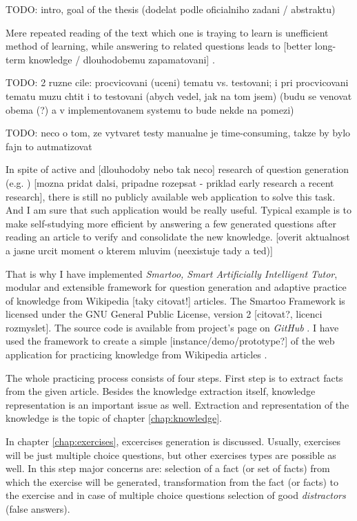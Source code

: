 \documentclass[a4paper, 12pt, twoside]{fithesis2}		%
\renewcommand{\_}{\leavevmode \kern0.0em\vbox{\hrule width0.4em}}
\newcounter{choice}
\begin{document}
TODO: intro, goal of the thesis (dodelat podle oficialniho zadani / abstraktu)

Mere repeated reading of the text which one is traying to learn is unefficient method of learning, while answering to related questions leads to [better long-term knowledge / dlouhodobemu zapamatovani] \parencite{edu-improve}.

TODO: 2 ruzne cile: procvicovani (uceni) tematu vs. testovani; i pri procvicovani tematu muzu chtit i to testovani (abych vedel, jak na tom jsem) (budu se venovat obema (?) a v implementovanem systemu to bude nekde na pomezi)

TODO: neco o tom, ze vytvaret testy manualne je time-consuming, takze by bylo fajn to autmatizovat

In spite of active and [dlouhodoby nebo tak neco] research of question generation
(e.g. \parencite{questions-wolfe, questions-eval}) [mozna pridat dalsi, pripadne rozepsat - priklad early research a recent research],
there is still no publicly available web application to solve this task.
And I am sure that such application would be really useful. Typical example is to make self-studying more efficient by answering a few generated questions after reading an article to verify and consolidate the new knowledge.
[overit aktualnost a jasne urcit moment o kterem mluvim (neexistuje tady a ted)]

That is why I have implemented \textit{Smartoo, Smart Artificially Intelligent Tutor}, modular and extensible framework for question generation and adaptive practice
of knowledge from Wikipedia [taky citovat!] articles.
The Smartoo Framework is licensed under the GNU General Public License, version 2 [citovat?, licenci rozmyslet].
The source code is available from project's page on \textit{GitHub} \parencite{smartoo-github}.
I have used the framework to create a simple [instance/demo/prototype?] of the web application for practicing knowledge from Wikipedia articles \parencite{smartoo-web}.

The whole practicing process consists of four steps.
First step is to extract facts from the given article.
Besides the knowledge extraction itself, knowledge representation is an important issue as well.
Extraction and representation of the knowledge is the topic of chapter \ref{chap:knowledge}.

In chapter \ref{chap:exercises}, excercises generation is discussed.
Usually, exercises will be just multiple choice questions, but other exercises types are possible as well.
In this step major concerns are: selection of a fact (or set of facts) from which the exercise will be generated, transformation from the fact (or facts) to the exercise and in case of multiple choice questions selection of good \textit{distractors} (false answers).
\end{document}
